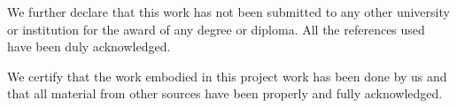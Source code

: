 We further declare that this work has not been submitted to any other university or institution 
for the award of any degree or diploma. All the references used have been duly acknowledged.

\vspace{0.1cm}

We certify that the work embodied in this project work has been done by us and that all material 
from other sources have been properly and fully acknowledged.

\vspace{0.1cm}

\begin{center}
\GenerateSignatureList
\end{center}

\cleardoublepage